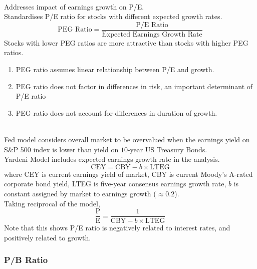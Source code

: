 \begin{definition} \\
Addresses impact of earnings growth on P/E.\\
Standardises P/E ratio for stocks with different expected growth rates.
\begin{equation}
\text{PEG Ratio} = \frac{\text{P/E Ratio}}{\text{Expected Earnings Growth Rate}} \nonumber
\end{equation}
Stocks with lower PEG ratios are more attractive than stocks with higher PEG ratios.
\begin{enumerate}[label=\roman*.]
\setlength{\itemsep}{0pt}
\item PEG ratio assumes linear relationship between P/E and growth.
\item PEG ratio does not factor in differences in risk, an important determinant of P/E ratio
\item PEG ratio does not account for differences in duration of growth.
\end{enumerate}
\end{definition}

\begin{method} \\
Fed model considers overall market to be overvalued when the earnings yield on S\&P 500 index is lower than yield on $10$-year US Treasury Bonds.\\
Yardeni Model includes expected earnings growth rate in the analysis.
\begin{equation}
\text{CEY} = \text{CBY} - b \times \text{LTEG} \nonumber
\end{equation}
where CEY is current earnings yield of market, CBY is current Moody's A-rated corporate bond yield, LTEG is five-year consensus earnings growth rate, $b$ is constant assigned by market to earnings growth ($\approx 0.2$).\\
Taking reciprocal of the model,
\begin{equation}
\frac{\text{P}}{\text{E}} = \frac{1}{\text{CBY} - b \times \text{LTEG}} \nonumber
\end{equation}
Note that this shows P/E ratio is negatively related to interest rates, and positively related to growth.
\end{method}

\subsubsection{P/B Ratio}

